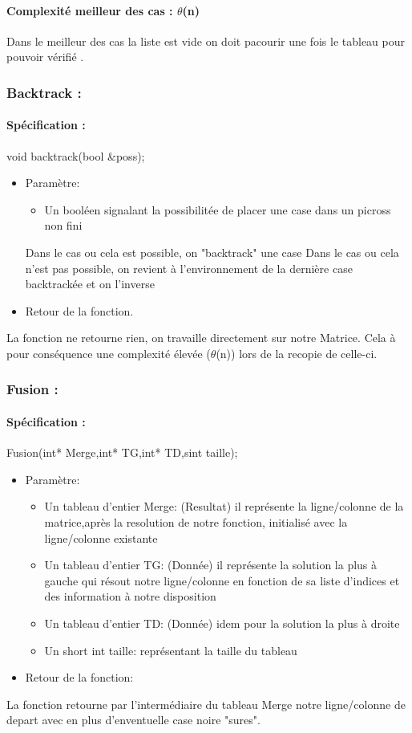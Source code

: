 \documentclass{article}
\begin{document}
\paragraph{Complexit\'e meilleur des cas : $\theta$(n)\newline}
Dans le meilleur des cas la liste est vide on doit pacourir une fois le tableau pour pouvoir v\'erifi\'e .
\subsubsection{Backtrack :}
\paragraph{Sp\'ecification :}
 void backtrack(bool \&poss);
\begin{itemize}
\item Param\`etre:
\begin{itemize}
\item Un booléen signalant la possibilitée de placer une case dans un picross non fini
\end{itemize}
Dans le cas ou cela est possible, on "backtrack" une case
Dans le cas ou cela n'est pas possible, on revient à l'environnement de la dernière case backtrackée et on l'inverse
\item Retour de la fonction.
\end{itemize}
La fonction ne retourne rien, on travaille directement sur notre Matrice.\newline
Cela à pour conséquence une complexité élevée ($\theta$(n)) lors de la recopie de celle-ci.
\subsubsection{Fusion :}
\paragraph{Sp\'ecification :}Fusion(int* Merge,int* TG,int* TD,sint taille);
\begin{itemize}
\item Param\`etre:
\begin{itemize}
\item Un tableau d'entier Merge: (Resultat) il repr\'esente la ligne/colonne de la matrice,après la resolution de notre fonction, initialisé avec la ligne/colonne existante
\item Un tableau d'entier TG: (Donn\'ee) il repr\'esente la solution la plus à gauche qui résout notre ligne/colonne en fonction de sa liste d'indices et des information à notre disposition
\item Un tableau d'entier TD: (Donn\'ee) idem pour la solution la plus à droite
\item Un short int taille: représentant la taille du tableau
\end{itemize}
\item Retour de la fonction:
\end{itemize}
La fonction retourne par l'interm\'ediaire du tableau Merge notre ligne/colonne de depart avec en plus d'enventuelle case noire "sures".
\end{document}
